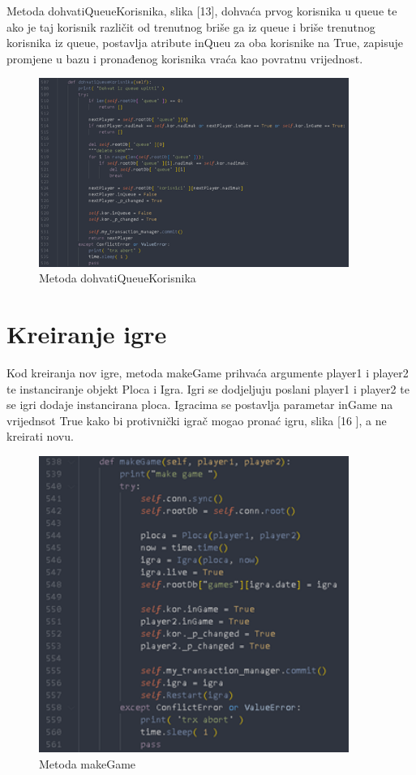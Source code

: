 \documentclass[]{foi} %
\begin{document}
Metoda dohvatiQueueKorisnika, slika [13], dohvaća prvog korisnika u queue te ako je taj korisnik različit od trenutnog briše ga iz queue i briše trenutnog korisnika iz queue, postavlja atribute inQueu za oba korisnike na True, zapisuje promjene u bazu i pronađenog korisnika vraća kao povratnu vrijednost.


\begin{figure}[]
    \centering
    \includegraphics[width=0.9\textwidth]{slike/impl_5.png}
    \caption{Metoda dohvatiQueueKorisnika \cite{Vlastita izrada}}
    \label{fig:podjela}
\end{figure}


\section{Kreiranje igre}

Kod kreiranja nov igre, metoda makeGame prihvaća argumente player1 i player2 te instanciranje objekt Ploca i Igra. Igri se dodjeljuju poslani player1 i player2 te se igri dodaje instancirana ploca. Igracima se postavlja parametar inGame na vrijednsot True kako bi protivnički igrač mogao pronać igru, slika [16 ], a ne kreirati novu.


\begin{figure}[]
    \centering
    \includegraphics[width=0.9\textwidth]{slike/impl_6.png}
    \caption{Metoda makeGame \cite{Vlastita izrada}}
    \label{fig:podjela}
\end{figure}
\end{document}
